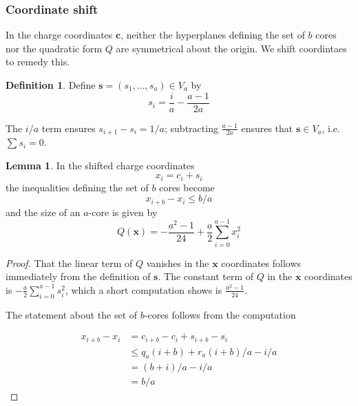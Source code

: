 \documentclass{amsart}[12pt]
\theoremstyle{definition}
\newtheorem{lemma}[dummy]{Lemma}
\newtheorem{definition}[dummy]{Definition}
\newcommand{\DP}{\mathcal{DP}}
\begin{document}








\subsubsection{Coordinate shift}
In the charge coordinates $\mathbf{c}$, neither the hyperplanes defining the set of $b$ cores nor the quadratic form $Q$ are symmetrical about the origin.  We shift coordintaes to remedy this.
\begin{definition}
Define $\mathbf{s}=(s_1,\dots, s_a)\in V_a$ by
$$s_i=\frac{i}{a}-\frac{a-1}{2a}$$
\end{definition}

The $i/a$ term ensures $s_{i+1}-s_i=1/a$; subtracting $\frac{a-1}{2a}$ ensures that  $\mathbf{s}\in V_a$, i.e. $\sum s_i=0$.
 
\begin{lemma}
In the shifted charge coordinates
$$x_i=c_i+s_i$$
the inequalities defining the set of $b$ cores become
$$x_{i+b}-x_{i}\leq b/a$$
and the size of an $a$-core is given by
$$Q(\mathbf{x})=-\frac{a^2-1}{24}+\frac{a}{2}\sum_{i=0}^{a-1} x_i^2$$
\end{lemma}

\begin{proof}
That the linear term of $Q$ vanishes in the $\mathbf{x}$ coordinates follows immediately from the definition of $\mathbf{s}$.  The constant term of $Q$ in the $\mathbf{x}$ coordinates is $-\frac{a}{2}\sum_{i=0}^{a-1} s_i^2$, which a short computation shows is $\frac{a^2-1}{24}$.

The statement about the set of $b$-cores follows from the computation

\begin{align*}
x_{i+b}-x_{i}&=c_{i+b}-c_i+s_{i+b}-s_i \\
&\leq  q_a(i+b)+r_a(i+b)/a-i/a \\
&=(b+i)/a-i/a \\
&=b/a
\end{align*}
\end{proof}
\end{document}
